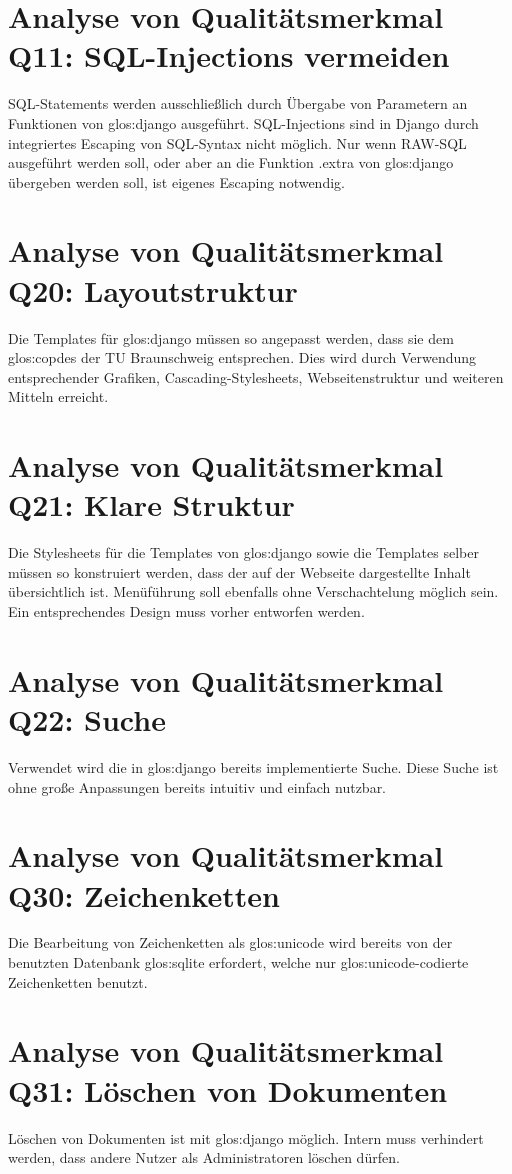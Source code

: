\section{Analyse von Qualitätsmerkmal Q11: SQL-Injections vermeiden}

SQL-Statements werden ausschließlich durch Übergabe von Parametern an 
Funktionen von \gls{glos:django} ausgeführt. SQL-Injections sind in Django durch 
integriertes Escaping von SQL-Syntax nicht möglich. Nur wenn RAW-SQL 
ausgeführt werden soll, oder aber an die Funktion .extra von \gls{glos:django} 
übergeben werden soll, ist eigenes Escaping notwendig.

\section{Analyse von Qualitätsmerkmal Q20: Layoutstruktur}

Die Templates für \gls{glos:django} müssen so angepasst werden, dass sie dem
\Gls{glos:copdes}  der TU Braunschweig entsprechen. Dies wird durch Verwendung
entsprechender Grafiken, Cascading-Stylesheets, Webseitenstruktur und weiteren
Mitteln erreicht.


\section{Analyse von Qualitätsmerkmal Q21: Klare Struktur}

Die Stylesheets für die Templates von \gls{glos:django} sowie die Templates selber
müssen so konstruiert werden, dass der auf der Webseite dargestellte 
Inhalt übersichtlich ist. Menüführung soll ebenfalls ohne Verschachtelung
möglich sein. Ein entsprechendes Design muss vorher entworfen werden.


\section{Analyse von Qualitätsmerkmal Q22: Suche}

Verwendet wird die in \gls{glos:django} bereits implementierte Suche. Diese Suche ist ohne
große Anpassungen bereits intuitiv und einfach nutzbar.


\section{Analyse von Qualitätsmerkmal Q30: Zeichenketten} 

Die Bearbeitung von Zeichenketten als \Gls{glos:unicode} wird bereits von der benutzten
Datenbank \Gls{glos:sqlite} erfordert, welche nur \Gls{glos:unicode}-codierte Zeichenketten benutzt.


\section{Analyse von Qualitätsmerkmal Q31: Löschen von Dokumenten} 

Löschen von Dokumenten ist mit \gls{glos:django} möglich. Intern muss verhindert werden,
dass andere Nutzer als Administratoren löschen dürfen.

